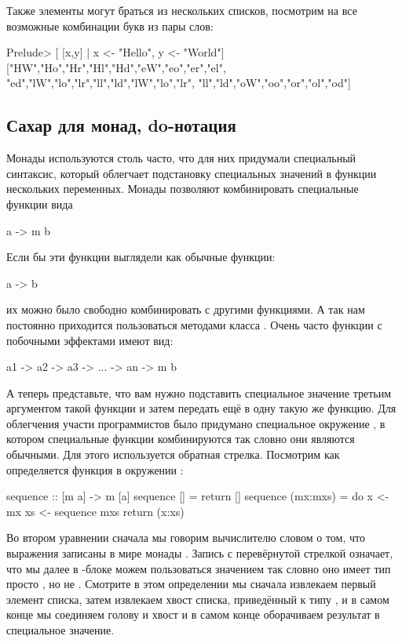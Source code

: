 Также элементы могут браться из нескольких списков,
посмотрим на все возможные комбинации букв из пары слов:

\begin{code}
Prelude> [ [x,y] | x <- "Hello", y <- "World"]
["HW","Ho","Hr","Hl","Hd","eW","eo","er","el",
 "ed","lW","lo","lr","ll","ld","lW","lo","lr",
 "ll","ld","oW","oo","or","ol","od"]
\end{code}

\subsection{Сахар для монад, do-нотация}

Монады используются столь часто, что для них придумали
специальный синтаксис, который облегчает подстановку
специальных значений в функции нескольких переменных. 
Монады позволяют комбинировать специальные функции 
вида 

\begin{code}
a -> m b
\end{code}

Если бы эти функции выглядели как обычные функции:

\begin{code}
a -> b
\end{code}

\noindent их можно было свободно комбинировать
с другими функциями. А так нам постоянно приходится
пользоваться методами класса . Очень
часто функции с побочными эффектами имеют вид:

\begin{code}
a1 -> a2 -> a3 -> ... -> an -> m b
\end{code}

А теперь представьте, что вам нужно подставить 
специальное значение третьим аргументом такой функции
и затем передать ещё в одну такую же функцию. 
Для облегчения участи программистов было придумано 
специальное окружение  , в котором специальные
функции комбинируются так словно они являются обычными.
Для этого используется обратная стрелка. Посмотрим
как определяется функция  в окружении :

\begin{code}
sequence :: [m a] -> m [a]
sequence []         = return []
sequence (mx:mxs)   = do
    x  <- mx
    xs <- sequence mxs
    return (x:xs)
\end{code}

Во втором уравнении сначала мы говорим вычислителю 
словом  о том, что выражения записаны в мире монады .
Запись с перевёрнутой стрелкой  означает, что
мы далее в -блоке можем пользоваться значением 
так словно оно имеет тип просто , но не .
Смотрите в этом определении мы сначала извлекаем первый
элемент списка, затем извлекаем хвост списка, приведённый
к типу , и в самом конце мы соединяем голову и 
хвост и в самом конце оборачиваем результат в специальное
значение. 

